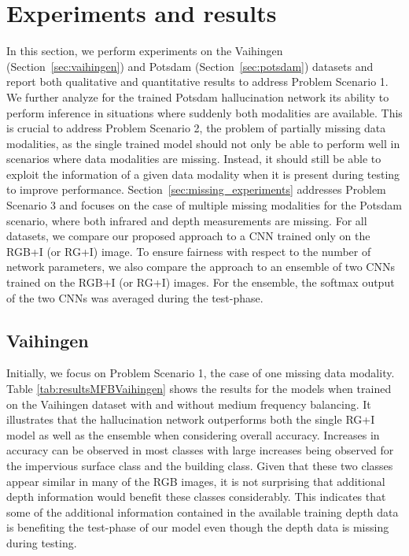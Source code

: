 \documentclass[journal]{IEEEtran}
\begin{document}
\section{Experiments and results}
\label{sec:experiments}
In this section, we perform experiments on the Vaihingen (Section~\ref{sec:vaihingen}) and Potsdam (Section~\ref{sec:potsdam}) datasets and report both qualitative and quantitative results to address Problem Scenario 1.
We further analyze for the trained Potsdam hallucination network its ability to perform inference in situations where suddenly both modalities are available. This is crucial to address Problem Scenario 2, the problem of partially missing data modalities, as the single trained model should not only be able to perform well in scenarios where data modalities are missing. Instead, it should still be able to exploit the information of a given data modality when it is present during testing to improve performance.
Section~\ref{sec:missing_experiments} addresses Problem Scenario 3 and focuses on the case of multiple missing modalities for the Potsdam scenario, where both infrared and depth measurements are missing. For all datasets, we compare our proposed approach to a CNN trained only on the RGB+I (or RG+I) image. To ensure fairness with respect to the number of network parameters, we also compare the approach to an ensemble of two CNNs trained on the RGB+I (or RG+I) images. For the ensemble, the softmax output of the two CNNs was averaged during the test-phase.

\subsection{Vaihingen}
Initially, we focus on Problem Scenario 1, the case of one missing data modality.
Table \ref{tab:resultsMFBVaihingen} shows the results for the models when trained on the Vaihingen dataset with and without medium frequency balancing. It illustrates that the hallucination network outperforms both the single RG+I model as well as the ensemble when considering overall accuracy. Increases in accuracy can be observed in most classes with large increases being observed for the impervious surface class and the building class. Given that these two classes appear similar in many of the RGB images, it is not surprising that additional depth information would benefit these classes considerably. This indicates that some of the additional information contained in the available training depth data is benefiting the test-phase of our model even though the depth data is missing during testing.
\end{document}
